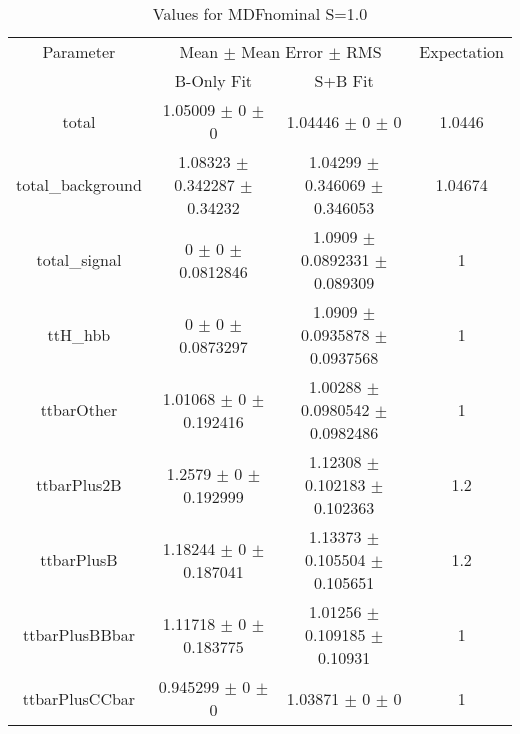 \begin{table}
\centering
\caption{Values for MDFnominal S=1.0}
\begin{tabular}{cccc}
\toprule
Parameter & \multicolumn{2}{c}{Mean $\pm$ Mean Error $\pm$ RMS} & Expectation\\
 & B-Only Fit & S+B Fit & \\
\midrule
total & \num{1.05009} $\pm$ \num{0} $\pm$ \num{0} & \num{1.04446} $\pm$ \num{0} $\pm$ \num{0} & \num{1.0446}\\
total\_background & \num{1.08323} $\pm$ \num{0.342287} $\pm$ \num{0.34232} & \num{1.04299} $\pm$ \num{0.346069} $\pm$ \num{0.346053} & \num{1.04674}\\
total\_signal & \num{0} $\pm$ \num{0} $\pm$ \num{0.0812846} & \num{1.0909} $\pm$ \num{0.0892331} $\pm$ \num{0.089309} & \num{1}\\
ttH\_hbb & \num{0} $\pm$ \num{0} $\pm$ \num{0.0873297} & \num{1.0909} $\pm$ \num{0.0935878} $\pm$ \num{0.0937568} & \num{1}\\
ttbarOther & \num{1.01068} $\pm$ \num{0} $\pm$ \num{0.192416} & \num{1.00288} $\pm$ \num{0.0980542} $\pm$ \num{0.0982486} & \num{1}\\
ttbarPlus2B & \num{1.2579} $\pm$ \num{0} $\pm$ \num{0.192999} & \num{1.12308} $\pm$ \num{0.102183} $\pm$ \num{0.102363} & \num{1.2}\\
ttbarPlusB & \num{1.18244} $\pm$ \num{0} $\pm$ \num{0.187041} & \num{1.13373} $\pm$ \num{0.105504} $\pm$ \num{0.105651} & \num{1.2}\\
ttbarPlusBBbar & \num{1.11718} $\pm$ \num{0} $\pm$ \num{0.183775} & \num{1.01256} $\pm$ \num{0.109185} $\pm$ \num{0.10931} & \num{1}\\
ttbarPlusCCbar & \num{0.945299} $\pm$ \num{0} $\pm$ \num{0} & \num{1.03871} $\pm$ \num{0} $\pm$ \num{0} & \num{1}\\
\bottomrule
\end{tabular}
\end{table}